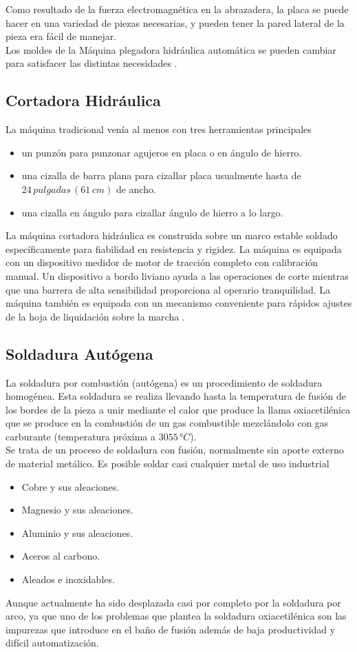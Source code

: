 \documentclass[12pt,graphicx,caption,rotating]{article}
\begin{document}
Como resultado de la fuerza electromagnética en la abrazadera, la placa se puede hacer en una variedad de piezas necesarias, y pueden tener la pared lateral de la pieza era fácil de manejar.\\
Los moldes de la Máquina plegadora hidráulica automática se pueden cambiar para satisfacer las distintas necesidades \cite{page2}.

\subsection{Cortadora Hidráulica}
\noindent
La máquina tradicional venía al menos con tres herramientas principales
\begin{itemize}
 \item un punzón para punzonar agujeros en placa o en ángulo de hierro.
 \item una cizalla de barra plana para cizallar placa usualmente hasta de $24\, pulgadas\, \left( 61\, cm\right)$ de ancho.
 \item una cizalla en ángulo para cizallar ángulo de hierro a lo largo.\cite{page3}
\end{itemize}
\noindent
La máquina cortadora hidráulica es construida sobre un marco estable soldado específicamente para fiabilidad en resistencia y rigidez. La máquina es equipada con un dispositivo medidor de motor de tracción completo con calibración manual. Un dispositivo a bordo liviano ayuda a las operaciones de corte mientras que una barrera de alta sensibilidad proporciona al operario tranquilidad. La máquina también es equipada con un mecanismo conveniente para rápidos ajustes de la hoja de liquidación sobre la marcha \cite{page4}.

\subsection{Soldadura Autógena}
\noindent
La soldadura por combustión (autógena) es un procedimiento de soldadura homogénea. Esta soldadura se realiza llevando hasta la temperatura de fusión de los bordes de la pieza a unir mediante el calor que produce la llama oxiacetilénica que se produce en la combustión de un gas combustible mezclándolo con gas carburante (temperatura próxima a $3055\,°C$).\\
Se trata de un proceso de soldadura con fusión, normalmente sin aporte externo de material metálico. Es posible soldar casi cualquier metal de uso industrial
\begin{itemize}
 \item Cobre y sus aleaciones.
 \item Magnesio y sus aleaciones.
 \item Aluminio y sus aleaciones.
 \item Aceros al carbono.
 \item Aleados e inoxidables.
\end{itemize}
\noindent
Aunque actualmente ha sido desplazada casi por completo por la soldadura por arco, ya que uno de los problemas que plantea la soldadura oxiacetilénica son las impurezas que introduce en el baño de fusión además de baja productividad y difícil automatización.\cite{page7}
\end{document}
